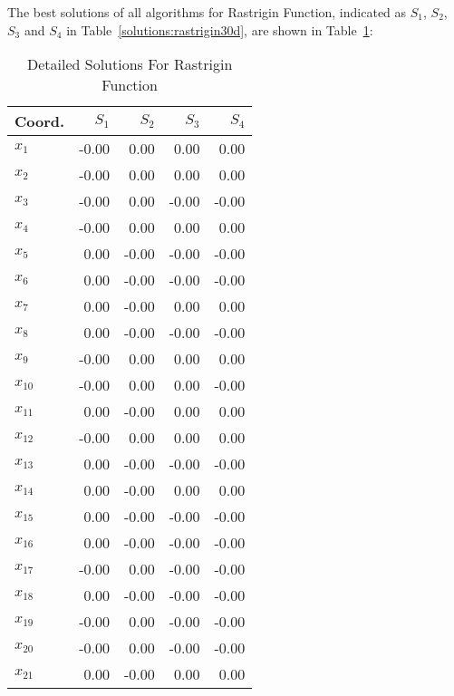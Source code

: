 
The best solutions of all algorithms for Rastrigin Function, indicated as
$S_{1}$, $S_{2}$, $S_{3}$ and $S_{4}$ in Table~\ref{solutions:rastrigin30d}, are shown
in Table~\ref{detailedsolutions:rastrigin30d}:

\begin{table}[H]
\centering
\caption{Detailed Solutions For Rastrigin Function}
\label{detailedsolutions:rastrigin30d}
\begin{tabular}{lrrrr}
\toprule
  Coord. &  $S_{1}$ &  $S_{2}$ &  $S_{3}$ &  $S_{4}$ \\
\midrule
 $x_{1}$ &    -0.00 &     0.00 &     0.00 &     0.00 \\
 $x_{2}$ &    -0.00 &     0.00 &     0.00 &     0.00 \\
 $x_{3}$ &    -0.00 &     0.00 &    -0.00 &    -0.00 \\
 $x_{4}$ &    -0.00 &     0.00 &     0.00 &     0.00 \\
 $x_{5}$ &     0.00 &    -0.00 &    -0.00 &    -0.00 \\
 $x_{6}$ &     0.00 &    -0.00 &    -0.00 &    -0.00 \\
 $x_{7}$ &     0.00 &    -0.00 &     0.00 &     0.00 \\
 $x_{8}$ &     0.00 &    -0.00 &    -0.00 &    -0.00 \\
 $x_{9}$ &    -0.00 &     0.00 &     0.00 &     0.00 \\
$x_{10}$ &    -0.00 &     0.00 &     0.00 &    -0.00 \\
$x_{11}$ &     0.00 &    -0.00 &     0.00 &     0.00 \\
$x_{12}$ &    -0.00 &     0.00 &     0.00 &     0.00 \\
$x_{13}$ &     0.00 &    -0.00 &    -0.00 &    -0.00 \\
$x_{14}$ &     0.00 &    -0.00 &     0.00 &     0.00 \\
$x_{15}$ &     0.00 &    -0.00 &    -0.00 &    -0.00 \\
$x_{16}$ &     0.00 &    -0.00 &    -0.00 &    -0.00 \\
$x_{17}$ &    -0.00 &     0.00 &    -0.00 &    -0.00 \\
$x_{18}$ &     0.00 &    -0.00 &    -0.00 &    -0.00 \\
$x_{19}$ &    -0.00 &     0.00 &    -0.00 &    -0.00 \\
$x_{20}$ &    -0.00 &     0.00 &    -0.00 &    -0.00 \\
$x_{21}$ &     0.00 &    -0.00 &     0.00 &     0.00 \\

\end{tabular}
\end{table}
